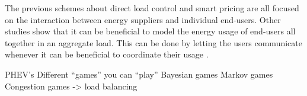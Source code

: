 The previous schemes about direct load control and smart pricing are all focused on the interaction between energy suppliers and individual end-users. Other studies show \cite{Mohsenian-RadWongJatskevichEtAl2010} that it can be beneficial to model the energy usage of end-users all together in an aggregate load. This can be done by letting the users communicate whenever it can be beneficial to coordinate their usage \cite{Mohsenian-RadWongJatskevichEtAl2010}. 

   


PHEV’s
Different “games” you can “play”
Bayesian games
Markov games
Congestion games -> load balancing